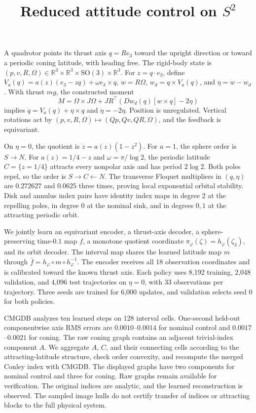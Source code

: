 \documentclass[11pt]{article}
\title{Reduced attitude control on $S^2$}
\author{}
\date{}
\newcommand{\R}{\mathbb R}
\begin{document}
\maketitle
\noindent A quadrotor points its thrust axis $q=Re_3$ toward the upright direction or toward a periodic coning latitude, with heading free. The rigid-body state is $(p,v,R,\Omega)\in\R^3\times\R^3\times\mathrm{SO}(3)\times\R^3$. For $z=q\cdot e_3$, define $V_a(q)=a(z)(e_3-zq)+\omega e_3\times q$, $w=R\Omega$, $w_d=q\times V_a(q)$, and $\eta=w-w_d$. With thrust $mg$, the constructed moment
\[
 M=\Omega\times J\Omega+JR^\top\left(Dw_d(q)[w\times q]-2\eta\right)
\]
implies $\dot q=V_a(q)+\eta\times q$ and $\dot\eta=-2\eta$. Position is unregulated. Vertical rotations act by $(p,v,R,\Omega)\mapsto(Qp,Qv,QR,\Omega)$, and the feedback is equivariant.

On $\eta=0$, the quotient is $\dot z=a(z)(1-z^2)$. For $a=1$, the sphere order is $S\to N$. For $a(z)=1/4-z$ and $\omega=\pi/\log2$, the periodic latitude $C=\{z=1/4\}$ attracts every nonpolar axis and has period $2\log2$. Both poles repel, so the order is $S\to C\leftarrow N$. The transverse Floquet multipliers in $(q,\eta)$ are $0.272627$ and $0.0625$ three times, proving local exponential orbital stability. Disk and annulus index pairs have identity index maps in degree $2$ at the repelling poles, in degree $0$ at the nominal sink, and in degrees $0,1$ at the attracting periodic orbit.

We jointly learn an equivariant encoder, a thrust-axis decoder, a sphere-preserving time-$0.1$ map $f$, a monotone quotient coordinate $\pi_\varphi(\zeta)=h_\varphi(\zeta_3)$, and its orbit decoder. The interval map shares the learned latitude map $m$ through $\bar f=h_\varphi\circ m\circ h_\varphi^{-1}$. The encoder receives all 18 observation coordinates and is calibrated toward the known thrust axis. Each policy uses 8,192 training, 2,048 validation, and 4,096 test trajectories on $\eta=0$, with 33 observations per trajectory. Three seeds are trained for 6,000 updates, and validation selects seed 0 for both policies.

CMGDB analyzes ten learned steps on 128 interval cells. One-second held-out componentwise axis RMS errors are $0.0010$--$0.0014$ for nominal control and $0.0017$--$0.0021$ for coning. The raw coning graph contains an adjacent trivial-index component $A$. We aggregate $A$, $C$, and their connecting cells according to the attracting-latitude structure, check order convexity, and recompute the merged Conley index with CMGDB. The displayed graphs have two components for nominal control and three for coning. Raw graphs remain available for verification. The original indices are analytic, and the learned reconstruction is observed. The sampled image hulls do not certify transfer of indices or attracting blocks to the full physical system.

\clearpage

\end{document}
